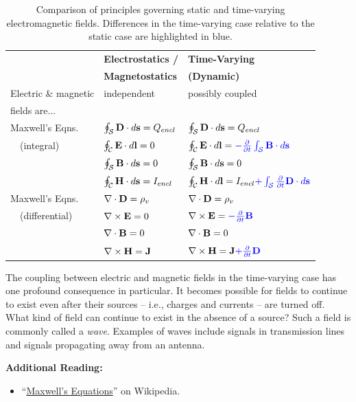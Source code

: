 \begin{table}[t]
\begin{center}
\begin{tabular}{lll}
~ & {\bf Electrostatics /} & {\bf Time-Varying} \\
~ & {\bf Magnetostatics}   & {\bf (Dynamic)} \\
\hline\hline
Electric \& magnetic & independent  & {\color{blue}possibly coupled} \\
fields are...       & ~  & ~ \\
\hline
Maxwell's Eqns. & $\oint_{\mathcal S}{{\bf D}\cdot d{\bf s}} = Q_{encl}$  & $\oint_{\mathcal S}{{\bf D}\cdot d{\bf s}} = Q_{encl}$ \\
~~(integral)   & $\oint_{\mathcal C}{{\bf E}\cdot d{\bf l}} = 0$         & $\oint_{\mathcal C}{{\bf E}\cdot d{\bf l}} = {\color{blue}-\frac{\partial}{\partial t}\int_{\mathcal S}{\bf B}\cdot d{\bf s}}$ \\
               & $\oint_{\mathcal S}{{\bf B}\cdot d{\bf s}} = 0$         & $\oint_{\mathcal S}{{\bf B}\cdot d{\bf s}} = 0$ \\
               & $\oint_{\mathcal C}{{\bf H}\cdot d{\bf s}} = I_{encl}$  & $\oint_{\mathcal C}{{\bf H}\cdot d{\bf l}} = I_{encl} {\color{blue} + \int_{\mathcal S}\frac{\partial}{\partial t}{\bf D}\cdot d{\bf s}}$ \\
\hline
Maxwell's Eqns.     & $\nabla\cdot{\bf D}=\rho_v$   & $\nabla\cdot{\bf D}=\rho_v$ \\
~~(differential)   & $\nabla\times{\bf E}=0$       & $\nabla\times{\bf E}={\color{blue}-\frac{\partial}{\partial t}{\bf B}}$ \\
                   & $\nabla\cdot{\bf B}=0$        & $\nabla\cdot{\bf B}=0$ \\
                   & $\nabla\times{\bf H}={\bf J}$ & $\nabla\times{\bf H}={\bf J} {\color{blue}+ \frac{\partial}{\partial t}{\bf D}}$ \\
\hline
\end{tabular}
\end{center}
\label{m0013_tComparison}
\caption{Comparison of principles governing static and time-varying electromagnetic fields.  Differences in the time-varying case relative to the static case are highlighted in {\color{blue}blue}.
}
\end{table}

The coupling between electric and magnetic fields in the time-varying case has one profound consequence in particular. 
It becomes possible for fields to continue to exist even after their sources -- i.e., charges and currents -- are turned off.  
What kind of field can continue to exist in the absence of a source?  
Such a field is commonly called a \emph{wave}.
Examples of waves include signals in transmission lines and signals propagating away from an antenna. 



{\bf Additional Reading:}
\begin{itemize}
\item ``\href{https://en.wikipedia.org/wiki/Maxwell's_equations}{Maxwell's Equations}'' on Wikipedia.
\end{itemize}

